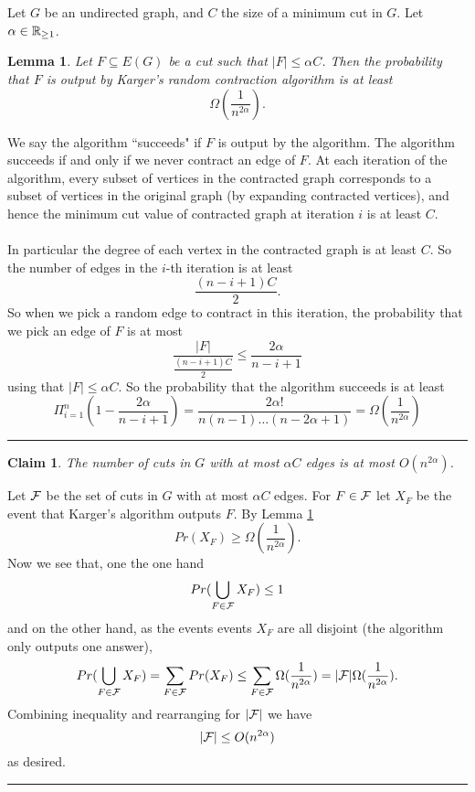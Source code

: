 \documentclass[letterpaper,12pt,oneside,onecolumn]{article}
\newenvironment{proof}{{\bf Proof:  }}{\hfill\rule{2mm}{2mm}}
\newtheorem{lemma}[fact]{Lemma}
\newtheorem{claim}[fact]{Claim}
\begin{document}
\section{}
Let $G$ be an undirected graph, and $C$ the size of a minimum cut in $G$. Let $\alpha \in \mathbb{R}_{\geq 1}$.
\begin{lemma}\label{lemma:2}
Let $F \subseteq E(G)$ be a cut such that $|F| \leq \alpha C$. Then the probability that $F$ is output by Karger's random contraction algorithm is at least
$$\Omega({\frac{1}{n^{2\alpha}}}).$$
\end{lemma}
\begin{proof}
We say the algorithm ``succeeds" if $F$ is output by the algorithm. The algorithm succeeds if and only if we never contract an edge of $F$. At each iteration of the algorithm, every subset of vertices in the contracted graph corresponds to a subset of vertices  in the original graph (by expanding contracted vertices), and hence the minimum cut value of contracted graph at iteration $i$ is at least $C$.
\paragraph{}
In particular the degree of each vertex in the contracted graph is at least $C$. So the number of edges in the $i$-th iteration is at least
$$\frac{(n-i+1)C}{2}.$$
So when we pick a random edge to contract in this iteration, the probability that we pick an edge of $F$ is at most
$$\frac{|F|}{\frac{(n-i+1)C}{2}} \leq \frac{2\alpha}{n-i+1}$$
using that $|F| \leq \alpha C.$ So the probability that the algorithm succeeds is at least
$$\Pi_{i=1}^n(1-\frac{2\alpha}{n-i+1}) = \frac{2\alpha!}{n(n-1)\dots(n-2\alpha + 1)} = \Omega(\frac{1}{n^{2\alpha}})$$
\end{proof}
\begin{claim}\label{claim2}
The number of cuts in $G$ with at most $\alpha C$ edges is at most $O(n^{2\alpha})$.
\end{claim}
\begin{proof}
Let $\mathcal{F}$ be the set of cuts in $G$ with at most $\alpha C$ edges. For $F \in \mathcal{F}$ let $X_F$ be the event that Karger's algorithm outputs $F$. By Lemma \ref{lemma:2}
$$Pr(X_F) \geq \Omega(\frac{1}{n^{2\alpha}}).$$
Now we see that, one the one hand
$$Pr(\bigcup_{F \in \mathcal{F}} X_F) \leq 1$$
and on the other hand, as the events events $X_F$ are all disjoint (the algorithm only outputs one answer),
$$Pr(\bigcup_{F \in \mathcal{F}} X_F) = \sum_{F \in \mathcal{F}} Pr(X_F) \leq \sum_{F \in \mathcal{F}} \Omega(\frac{1}{n^{2\alpha}}) = |\mathcal{F}|\Omega(\frac{1}{n^{2\alpha}}).$$
Combining inequality and rearranging for $|\mathcal{F}|$ we have
$$|\mathcal{F}| \leq O(n^{2\alpha})$$
as desired.
\end{proof}
\end{document}
